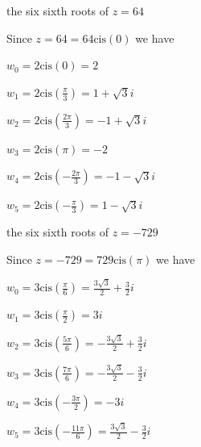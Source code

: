 \documentclass{ximera}
\begin{document}
\begin{question}
\begin{problem}
\begin{solution}
\end{solution}
\end{problem}

\begin{problem}
the six sixth roots of $z = 64$

\begin{solution}
Since $z = 64 = 64\text{cis}(0)$ we have 

$w_{0} = 2\text{cis}(0) = 2$

$w_{1} = 2\text{cis}\left(\frac{\pi}{3}\right) = 1 + \sqrt{3}i$

$w_{2} = 2\text{cis}\left(\frac{2\pi}{3}\right) = -1 + \sqrt{3}i$

$w_{3} = 2\text{cis}\left(\pi\right) = -2$

$w_{4} = 2\text{cis}\left(-\frac{2\pi}{3}\right) = -1 - \sqrt{3}i$

$w_{5} = 2\text{cis}\left(-\frac{\pi}{3}\right) = 1 - \sqrt{3}i$

\end{solution}
\end{problem}

\begin{problem} \label{polarrootslast}
the six sixth roots of $z = -729$ 

\begin{solution}
Since $z = -729 = 729 \text{cis}(\pi)$ we have 

$w_{0} = 3\text{cis}\left(\frac{\pi}{6}\right) = \frac{3\sqrt{3}}{2} + \frac{3}{2}i$

$w_{1} = 3\text{cis}\left(\frac{\pi}{2}\right) = 3i$

$w_{2} = 3\text{cis}\left(\frac{5\pi}{6}\right) = -\frac{3\sqrt{3}}{2} + \frac{3}{2}i$

$w_{3} = 3\text{cis}\left(\frac{7\pi}{6}\right) =  -\frac{3\sqrt{3}}{2}-\frac{3}{2}i$

$w_{4} = 3\text{cis}\left(-\frac{3\pi}{2}\right) = -3i$

$w_{5} = 3\text{cis}\left(-\frac{11\pi}{6}\right) = \frac{3\sqrt{3}}{2} - \frac{3}{2}i$

\end{solution}

\end{problem}


\end{question}
\end{document}
